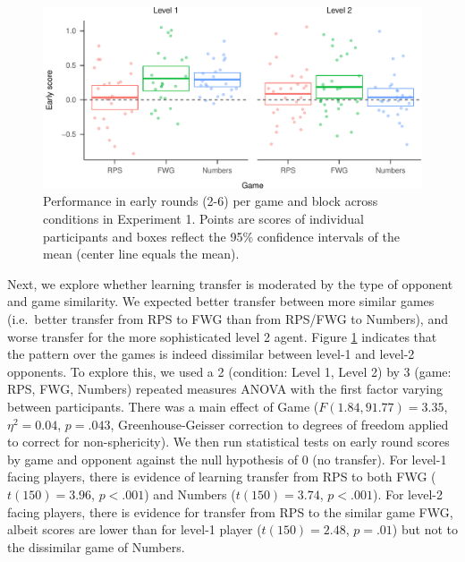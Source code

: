 \documentclass[
  english,
  man,floatsintext]{apa6}
\begin{document}
\begin{figure}

{\centering \includegraphics{paper_draft_2021_files/figure-latex/exp1-early-score-by-opp-1} 

}

\caption{\label{ref:figure4-caption}Performance in early rounds (2-6) per game and block across conditions in Experiment 1. Points are scores of individual participants and boxes reflect the 95\% confidence intervals of the mean (center line equals the mean).}\label{fig:exp1-early-score-by-opp}
\end{figure}

Next, we explore whether learning transfer is moderated by the type of opponent and game similarity. We expected better transfer between more similar games (i.e.~better transfer from RPS to FWG than from RPS/FWG to Numbers), and worse transfer for the more sophisticated level 2 agent. Figure \ref{fig:exp1-early-score-by-opp} indicates that the pattern over the games is indeed dissimilar between level-1 and level-2 opponents. To explore this, we used a 2 (condition: Level 1, Level 2) by 3 (game: RPS, FWG, Numbers) repeated measures ANOVA with the first factor varying between participants. There was a main effect of Game (\(F(1.84,91.77) = 3.35\), \(\eta^{2} = 0.04\), \(p = .043\), Greenhouse-Geisser correction to degrees of freedom applied to correct for non-sphericity). We then run statistical tests on early round scores by game and opponent against the null hypothesis of 0 (no transfer). For level-1 facing players, there is evidence of learning transfer from RPS to both FWG (\(t(150) = 3.96\), \(p < .001\)) and Numbers (\(t(150) = 3.74\), \(p < .001\)). For level-2 facing players, there is evidence for transfer from RPS to the similar game FWG, albeit scores are lower than for level-1 player (\(t(150) = 2.48\), \(p = .01\)) but not to the dissimilar game of Numbers.
\end{document}
